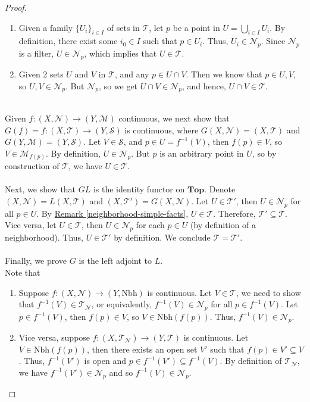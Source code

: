 \documentclass{treatise}
\begin{document}
\begin{shaded}
\begin{proof}
\begin{enumerate}
    \item Given a family $\{ U_i \}_{i \in I}$ of sets in $\mathcal{T}$, let $p$ be a point in $U = \bigcup_{i \in I} U_i$. By definition, there exist some $i_0 \in I$ such that $p \in U_i$. Thus, $U_i \in \mathcal{N}_p$. Since $\mathcal{N}_p$ is a filter, $U \in \mathcal{N}_p$, which implies that $U \in \mathcal{T}$.
    \item Given 2 sets $U$ and $V$ in $\mathcal{T}$, and any $p \in U \cap V$. Then we know that $p \in U, V$, so $U, V \in \mathcal{N}_p$. But $\mathcal{N}_p$, so we get $U \cap V \in \mathcal{N}_p$, and hence, $U \cap V \in \mathcal{T}$.
\end{enumerate}
\ \\
Given $f: (X, \mathcal{N}) \to (Y, \mathcal{M})$ continuous, we next show that $G(f) = f: (X, \mathcal{T}) \to (Y, \mathcal{S})$ is continuous, where $G(X, \mathcal{N}) = (X, \mathcal{T})$ and $G(Y, \mathcal{M}) = (Y, \mathcal{S})$. Let $V \in \mathcal{S}$, and $p \in U = f^{-1}(V)$, then $f(p) \in V$, so $V \in \mathcal{M}_{f(p)}$. By definition, $U \in \mathcal{N}_p$. But $p$ is an arbitrary point in $U$, so by construction of $\mathcal{T}$, we have $U \in \mathcal{T}$.
\\
\\
Next, we show that $GL$ is the identity functor on $\mathbf{Top}$. Denote $(X, \mathcal{N}) = L(X, \mathcal{T})$ and $(X, \mathcal{T}') = G(X, \mathcal{N})$. Let $U \in \mathcal{T}'$, then $U \in \mathcal{N}_p$ for all $p \in U$. By \hyperref[neighborhood-simple-facts]{Remark \ref*{neighborhood-simple-facts}}, $U \in \mathcal{T}$. Therefore, $\mathcal{T}' \subseteq \mathcal{T}$. Vice versa, let $U \in \mathcal{T}$, then $U \in \mathcal{N}_p$ for each $p \in U$ (by definition of a neighborhood). Thus, $U \in \mathcal{T}'$ by definition. We conclude $\mathcal{T} = \mathcal{T}'$.
\\
\\
Finally, we prove $G$ is the left adjoint to $L$.
\\
Note that
\begin{enumerate}
    \item Suppose $f: (X, \mathcal{N}) \to (Y, \mathrm{Nbh})$ is continuous. Let $V \in \mathcal{T}$, we need to show that $f^{-1}(V) \in \mathcal{T}_\mathcal{N}$, or equivalently, $f^{-1}(V) \in \mathcal{N}_p$ for all $p \in f^{-1}(V)$. Let $p \in f^{-1}(V)$, then $f(p) \in V$, so $V \in \mathrm{Nbh}(f(p))$. Thus, $f^{-1}(V) \in \mathcal{N}_p$.
    \item Vice versa, suppose $f: (X, \mathcal{T}_\mathcal{N}) \to (Y, \mathcal{T})$ is continuous. Let $V \in \mathrm{Nbh}(f(p))$, then there exists an open set $V'$ such that $f(p) \in V' \subseteq V$. Thus, $f^{-1}(V')$ is open and $p \in f^{-1}(V') \subseteq f^{-1}(V)$. By definition of $\mathcal{T}_\mathcal{N}$, we have $f^{-1}(V') \in \mathcal{N}_p$ and so $f^{-1}(V) \in \mathcal{N}_p$.

\end{enumerate}
\end{proof}
\end{shaded}
\end{document}
